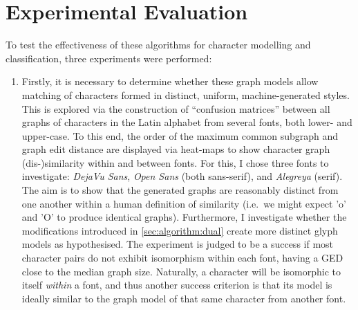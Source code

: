 \documentclass{mpaper}
\begin{document}
\section{Experimental Evaluation} %
\label{sec:evaluation}

To test the effectiveness of these algorithms for character modelling and classification, three experiments were performed:



\begin{enumerate}
	\item Firstly, it is necessary to determine whether these graph models allow matching of characters formed in distinct, uniform, machine-generated styles.
	This is explored via the construction of ``confusion matrices'' between all graphs of characters in the Latin alphabet from several fonts, both lower- and upper-case.
	To this end, the order of the maximum common subgraph and graph edit distance are displayed via heat-maps to show character graph (dis-)similarity within and between fonts.
	For this, I chose three fonts to investigate: \emph{DejaVu Sans}, \emph{Open Sans} (both sans-serif), and \emph{Alegreya} (serif).
	The aim is to show that the generated graphs are reasonably distinct from one another within a human definition of similarity (i.e.\ we might expect 'o' and 'O' to produce identical graphs).
	Furthermore, I investigate whether the modifications introduced in \cref{sec:algorithm:dual} create more distinct glyph models as hypothesised.
	The experiment is judged to be a success if most character pairs do not exhibit isomorphism within each font, having a GED close to the median graph size.
	Naturally, a character will be isomorphic to itself \emph{within} a font, and thus another success criterion is that its model is ideally similar to the graph model of that same character from another font.
	

\end{enumerate}
\end{document}
